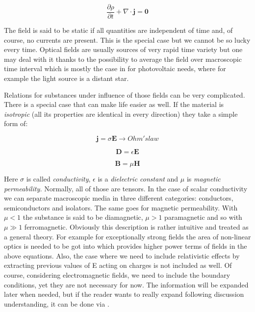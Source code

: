 \begin{equation}
\frac{\partial\rho}{\partial t} + \nabla \cdot \mathbf{j = 0}
\end{equation}

The field is said to be static if all quantities are independent of time
and, of course, no currents are present. This is the special case but we
cannot be so lucky every time. Optical fields are usually sources of
very rapid time variety but one may deal with it thanks to the
possibility to average the field over macroscopic time interval which is
mostly the case in for photovoltaic needs, where for example the light
source is a distant star.

Relations for substances under influence of those fields can be very
complicated. There is a special case that can make life easier as well.
If the material is \emph{isotropic} (all its properties are identical in
every direction) they take a simple form of:

\begin{equation}
\mathbf{j} = \sigma\mathbf{E \rightarrow} Ohm's law
\end{equation}

\begin{equation}
\mathbf{D =}\epsilon\mathbf{E}
\end{equation}

\begin{equation}
\mathbf{B =}\mu\mathbf{H}
\end{equation}

Here \(\sigma\) is called \emph{conductivity}, \(\epsilon\) is a
\emph{dielectric constant} and \(\mu\) is \emph{magnetic permeability.}
Normally, all of those are tensors. In the case of scalar conductivity
we can separate macroscopic media in three different categories:
conductors, semiconductors and isolators. The same goes for magnetic
permeability. With \(\mu < 1\) the substance is said to be diamagnetic,
\(\mu > 1\) paramagnetic and so with \(\mu \gg 1\) ferromagnetic.
Obviously this description is rather intuitive and treated as a general
theory. For example for exceptionally strong fields the area of
non-linear optics is needed to be got into which provides higher power
terms of fields in the above equations. Also, the case where we need to
include relativistic effects by extracting previous values of E acting
on charges is not included as well. Of course, considering electromagnetic fields, we need to include the boundary conditions, yet they are not necessary for now. The information will be expanded
later when needed, but if the reader wants to really expand following
discussion understanding, it can be done via \cite{Born1999} \cite{Jackson}.


